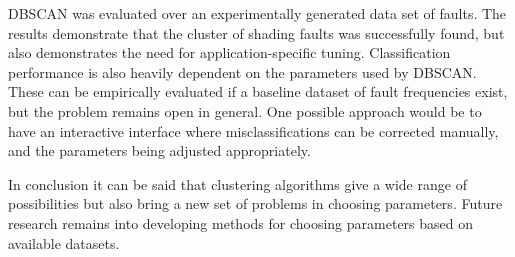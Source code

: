 DBSCAN was evaluated over an experimentally generated data set of faults.
The results demonstrate that the cluster of shading faults was successfully found, but also demonstrates the need for application-specific tuning.
Classification performance is also heavily dependent on the parameters used by DBSCAN.
These can be empirically evaluated if a baseline dataset of fault frequencies exist, but the problem remains open in general.
One possible approach would be to have an interactive interface where misclassifications can be corrected manually, and the parameters being adjusted appropriately.

In conclusion it can be said that clustering algorithms give a wide range of possibilities but also bring a new set of problems in choosing parameters.
Future research remains into developing methods for choosing parameters based on available datasets.




